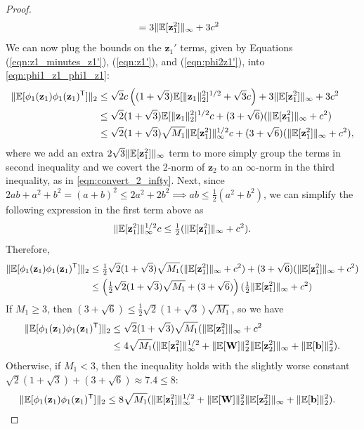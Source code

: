\documentclass[twoside]{article}
\newcommand{\vb}{\mathbf{b}}
\newcommand{\vz}{\mathbf{z}}
\newcommand{\mW}{\mathbf{W}}
\newcommand{\E}{\mathbb{E}}
\newcommand{\T}{\text{\textsf{T}}}
\DeclarePairedDelimiter\norm{\|}{\|}             %
\theoremstyle{theoremstyle}
\begin{document}
\begin{proof}
\begin{align}
        &=
            3 \norm{\E[\vz_1^2]}_\infty + 3 c^2 \label{eqn:phi2z1'}
    \end{align}
    We can now plug the bounds on the $\vz_1'$ terms, given by Equations (\ref{eqn:z1_minutes_z1'}), (\ref{eqn:z1'}), and (\ref{eqn:phi2z1'}), into \cref{eqn:phi1_z1_phi1_z1}:
    \begin{align}
        \norm{\E[\phi_1(\vz_1) \phi_1(\vz_1)^\T]}_2
        &\le
            \sqrt{2}c \left((1+\sqrt{3})\E[\norm{\vz_1}^2_2]^{1/2} + \sqrt{3}c\right) + 3 \norm{\E[\vz_1^2]}_\infty + 3 c^2 \\
        &\le
            \sqrt{2}(1+\sqrt{3})\E[\norm{\vz_1}^2_2]^{1/2} c
            + (3+\sqrt{6})( \norm{\E[\vz_1^2]}_\infty + c^2) \\
        &\le
            \sqrt{2}(1+\sqrt{3})\sqrt{M_1}\norm{\E[\vz_1^2]}_\infty^{1/2} c + (3+\sqrt{6})( \norm{\E[\vz_1^2]}_\infty + c^2),
    \end{align}
    where we add an extra $2\sqrt{3}\norm{\E[\vz_1^2]}_\infty$ term to more simply group the terms in second inequality and we covert the 2-norm of $\vz_2$ to an $\infty$-norm in the third inequality, as in \cref{eqn:convert_2_infty}. Next, since $2ab + a^2 + b^2 = (a + b)^2 \le 2a^2 + 2b^2 \implies ab \le \tfrac12(a^2 + b^2)$, we can simplify the following expression in the first term above as
    \begin{equation}
        \norm{\E[\vz_1^2]}_\infty^{1/2} c \le \tfrac{1}{2}( \norm{\E[\vz_1^2]}_\infty + c^2).
    \end{equation}
    Therefore, 
    \begin{align}
        \norm{\E[\phi_1(\vz_1) \phi_1(\vz_1)^\T]}_2
        &\le
            \tfrac12\sqrt{2}(1+\sqrt{3})\sqrt{M_1}( \norm{\E[\vz_1^2]}_\infty + c^2)
            + (3+\sqrt{6})(\norm{\E[\vz_1^2]}_\infty + c^2) \\
        &\le
            \left(\tfrac12\sqrt{2}(1+\sqrt{3})\sqrt{M_1} + (3+\sqrt{6}) \right)
            (\tfrac12\norm{\E[\vz_1^2]}_\infty + c^2) 
    \end{align}
    If $M_1 \ge 3$, then $(3+\sqrt{6}) \le \tfrac12\sqrt{2}(1+\sqrt{3}) \sqrt{M_1}$, so we have
    \begin{align}
        \norm{\E[\phi_1(\vz_1) \phi_1(\vz_1)^\T]}_2
        &\le
            \sqrt{2}(1+\sqrt{3})\sqrt{M_1}( \norm{\E[\vz_1^2]}_\infty + c^2 \\
        &\le
            4\sqrt{M_1} ( \norm{\E[\vz_1^2]}_\infty^{1/2} + \norm{\E[\mW]}_2^2 \norm{\E[\vz_{2}^2]}_\infty + \norm{\E[\vb]}_2^2).
    \end{align}
    Otherwise, if $M_1 < 3$, then the inequality holds with the slightly worse constant $\sqrt{2}(1+\sqrt{3}) +  (3+\sqrt{6}) \approx 7.4 \le 8$:
    \begin{align}
        \norm{\E[\phi_1(\vz_1) \phi_1(\vz_1)^\T]}_2
        &\le
            8\sqrt{M_1} ( \norm{\E[\vz_1^2]}_\infty^{1/2} + \norm{\E[\mW]}_2^2 \norm{\E[\vz_{2}^2]}_\infty + \norm{\E[\vb]}_2^2).
    \end{align}
\end{proof}
\end{document}
